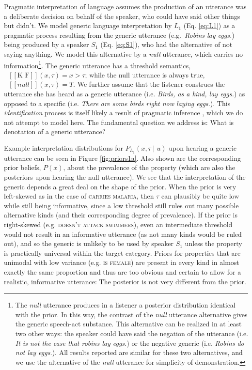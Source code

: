 \documentclass[10pt,letterpaper]{article}
\newcommand{\denote}[1]{\mbox{ $[\![ #1 ]\!]$}}
\begin{document}
Pragmatic interpretation of language assumes the production of an utterance was a deliberate decision on behalf of the speaker, who could have said other things but didn't. 
We model generic language interpretation by $L_{1}$ (Eq. \ref{eq:L1}) as a pragmatic process resulting from the generic utterance (e.g.~\emph{Robins lay eggs.}) being produced by a speaker $S_{1}$ (Eq. \ref{eq:S1}), who had the alternative of not saying anything. 
We model this alternative by a \emph{null} utterance, which carries no information\footnote{
The \emph{null} utterance produces in a listener a posterior distribution identical with the prior. 
In this way, the contrast of the \emph{null} utterance alternative gives the generic speech-act substance.
This alternative can be realized in at least two other ways: the speaker could have said the negation of the utterance (i.e. \emph{It is not the case that robins lay eggs.}) or the negative generic (i.e. \emph{Robins do not lay eggs.}).
All results reported are similar for these two alternatives, and we use the alternative of the \emph{null} utterance for simplicity of demonstration.}.
The generic utterance has a threshold semantics, $\denote{\text{K F}}(x, \tau)=x>\tau$; while the null utterance is always true, $\denote{null}(x, \tau)=T$.
We further assume that the listener construes the utterance she has heard as a generic utterance (i.e. \emph{Birds, as a kind, lay eggs.}) as opposed to a specific (i.e. \emph{There are some birds right now laying eggs.}).
This \emph{identification} process is itself likely a result of pragmatic inference \cite{Cimpian2008}, which we do not attempt to model here. 
The fundamental question we address is: What is denotation of a generic utterance?



Example interpretation distributions for $P_{L_{1}}(x , \tau \mid u)$ upon hearing a generic utterance can be seen in Figure \ref{fig:priors1a}. 
Also shown are the corresponding prior beliefs, $P(x)$, about the prevalence of the property (which are also the posteriors upon hearing the null utterance).
We see that the interpretation of the generic depends a great deal on the shape of the prior.
When the prior is very left-skewed as in the case of \textsc{carries malaria}, then $\tau$ can plausibly be quite low while still being informative, since a low threshold still rules out many possible alternative kinds (and their corresponding degree of prevalence).
If the prior is right-skewed (e.g. \textsc{doesn't attack swimmers}), even an intermediate threshold would not result in an informative utterance (as not many kinds would be ruled out), and so the generic is unlikely to be used by speaker $S_1$ unless the property is practically-universal within the target category. 
Priors for properties that are unimodal with low variance (e.g. \textsc{is female}) are present in every kind in almost exactly the same proportion and thus are too obvious and certain to allow for a realistic, informative utterance: The posterior is not very different from the prior. 
\end{document}
